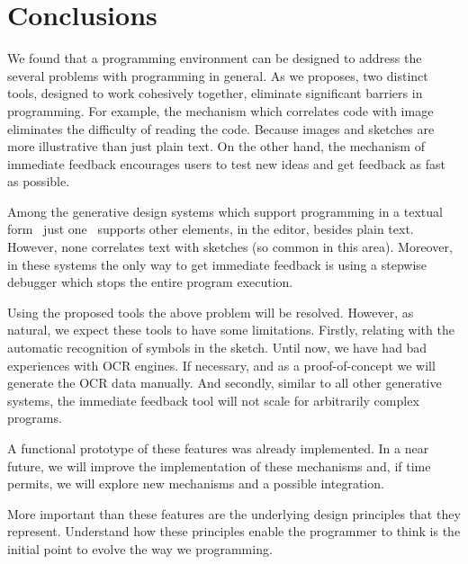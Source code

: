 
% 
% 

\section{Conclusions}
\label{sec:fin}

We found that a programming environment can be designed to address the several problems with programming in general. As we proposes, two distinct tools, designed to work cohesively together, eliminate significant barriers in programming. For example, the mechanism which correlates code with image eliminates the difficulty of reading the code. Because images and sketches are more illustrative than just plain text. On the other hand, the mechanism of immediate feedback encourages users to test new ideas and get feedback as fast as possible.

Among the generative design systems which support programming in a textual form~\cite{aish2012designscript,lopes2011portable} just one~\cite{lopes2011portable} supports other elements, in the editor, besides plain text. However, none correlates text with sketches (so common in this area). Moreover, in these systems the only way to get immediate feedback is using a stepwise debugger which stops the entire program execution.

Using the proposed tools the above problem will be resolved. However, as natural, we expect these tools to have some limitations. Firstly, relating with the automatic recognition of symbols in the sketch. Until now, we have had bad experiences with OCR engines. If necessary, and as a proof-of-concept we will generate the OCR data manually. And secondly, similar to all other generative systems, the immediate feedback tool will not scale for arbitrarily complex programs.

A functional prototype of these features was already implemented. In a near future, we will improve the implementation of these mechanisms and, if time permits, we will explore new mechanisms and a possible integration.

More important than these features are the underlying design principles that they represent. Understand how these principles enable the programmer to think is the initial point to evolve the way we programming.